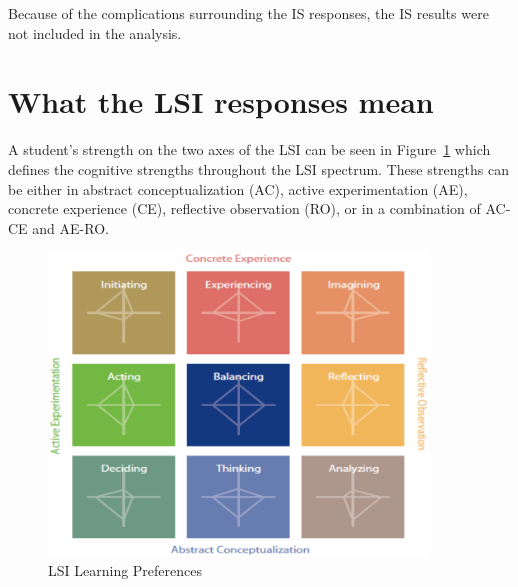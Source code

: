 Because of the complications surrounding the IS responses, the IS results were not included in the analysis.

\section{What the LSI responses mean}
A student's strength on the two axes of the LSI can be seen in Figure~\ref{fig:learning-preferences} which defines the cognitive strengths throughout the LSI spectrum. These strengths can be either in abstract conceptualization (AC), active experimentation (AE), concrete experience (CE), reflective observation (RO), or in a combination of AC-CE and AE-RO.

\begin{figure}
  \centering
  \includegraphics[width=0.9\textwidth]{figures/chapter4/learning-preferences.png}
  \caption{LSI Learning Preferences}
  \label{fig:learning-preferences}
\end{figure}

